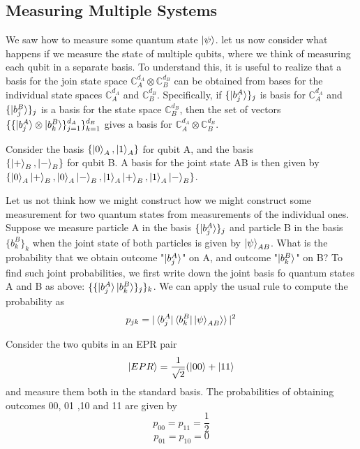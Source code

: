 \subsection{Measuring Multiple Systems}
We saw how to measure some quantum state $\ket{\psi}$. let us now consider what happens if we measure the state of multiple qubits, where we think of measuring each qubit in a separate basis. To understand this, it is useful to realize that a basis for the join state space $\mathbb{C}_A^{d_A} \otimes \mathbb{C}_B^{d_B}$ can be obtained from bases for the individual state spaces $\mathbb{C}_A^{d_A}$ and $\mathbb{C}_B^{d_B}$. Specifically, if $\{\ket{b_j^A}\}_j$ is basis for $\mathbb{C}_A^{d_A}$ and $\{\ket{b_j^B}\}_j$ is a basis for the state space $\mathbb{C}_B^{d_B}$, then the set of vectors $\{\{\ket{b_j^A}\otimes \ket{b_k^B}\}_{j=1}^{d_A}\}_{k=1}^{d_B}$ gives a basis for $\mathbb{C}_A^{d_A}\otimes \mathbb{C}_B^{d_B}$.

\begin{example}
    Consider the basis $\{\ket{0}_A,\ket{1}_A\}$ for qubit A, and the basis \\$\{\ket{+}_B,\ket{-}_B\}$ for qubit B. A basis for the joint state AB is then given by \\
    $\{\ket{0}_A\ket{+}_B,\ket{0}_A\ket{-}_B,\ket{1}_A\ket{+}_B,\ket{1}_A\ket{-}_B\}$.
\end{example}

Let us not think how we might construct how we might construct some measurement for two quantum states from measurements of the individual ones. Suppose we measure particle A in the basis $\{\ket{b_j^A}\}_j$ and particle B in the basis $\{b_k^B\}_k$ when the joint state of both particles is given by $\ket{\psi}_{AB}$. What is the probability that we obtain outcome "$\ket{b_j^A}$" on A, and outcome "$\ket{b_k^B}$" on B? To find such joint probabilities, we first write down the joint basis fo quantum states A and B as above: $\{\{\ket{b_j^A}\ket{b_k^B}\}_j\}_k$. We can apply the usual rule to compute the probability as 
\[
p_{jk}=|\braket{b_j^A|\braket{b_k^B|\ket{\psi}_{AB}}}|^2
\]
\begin{example}
    Consider the two qubits in an EPR pair
    \[
    \ket{EPR}=\frac{1}{\sqrt{2}}(\ket{00}+\ket{11}
    \]
    and measure them both in the standard basis. The probabilities of obtaining outcomes 00, 01 ,10 and 11 are given by
    \[
    p_{00}=p_{11}=\frac{1}{2}
    \]
    \[
    p_{01}=p_{10}=0
    \]
\end{example}

